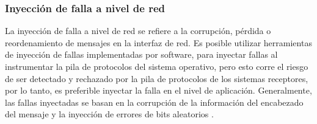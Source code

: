 \subsubsection{Inyección de falla a nivel de red}

\par La inyección de falla a nivel de red se refiere a la corrupción, pérdida o reordenamiento de mensajes en la interfaz de red. Es posible utilizar herramientas de inyección de fallas implementadas por software, para inyectar fallas al instrumentar la pila de protocolos del sistema operativo, pero esto corre el riesgo de ser detectado y rechazado por la pila de protocolos de los sistemas receptores, por lo tanto, es preferible inyectar la falla en el nivel de aplicación. Generalmente, las fallas inyectadas se basan en la corrupción de la información del encabezado del mensaje y la inyección de errores de bits aleatorios \cite{LIB19}.\\

